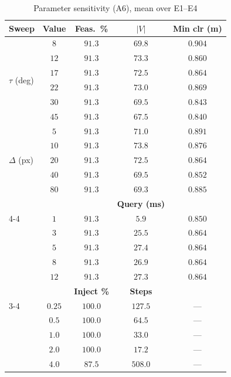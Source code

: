 \documentclass[conference]{IEEEtran}
\begin{document}
\begin{table}[htbp]
\caption{Parameter sensitivity (A6), mean over E1--E4}
\label{tab:sweep}
\begin{center}
\begin{tabular}{@{}lcccc@{}}
\toprule
\textbf{Sweep} & \textbf{Value} & \textbf{Feas.\ \%} & \textbf{$|V|$} & \textbf{Min clr (m)} \\ \midrule
\multirow{6}{*}{$\tau$ (deg)}
 & $8$  & $91.3$ & $69.8$ & $0.904$ \\
 & $12$ & $91.3$ & $73.3$ & $0.860$ \\
 & $17$ & $91.3$ & $72.5$ & $0.864$ \\
 & $22$ & $91.3$ & $73.0$ & $0.869$ \\
 & $30$ & $91.3$ & $69.5$ & $0.843$ \\
 & $45$ & $91.3$ & $67.5$ & $0.840$ \\ \midrule
\multirow{5}{*}{$\Delta$ (px)}
 & $5$  & $91.3$ & $71.0$ & $0.891$ \\
 & $10$ & $91.3$ & $73.8$ & $0.876$ \\
 & $20$ & $91.3$ & $72.5$ & $0.864$ \\
 & $40$ & $91.3$ & $69.5$ & $0.852$ \\
 & $80$ & $91.3$ & $69.3$ & $0.885$ \\ \midrule
 & & & \textbf{Query (ms)} & \\ \cmidrule(l){4-4}
\multirow{5}{*}{$K$}
 & $1$  & $91.3$ & $5.9$  & $0.850$ \\
 & $3$  & $91.3$ & $25.5$ & $0.864$ \\
 & $5$  & $91.3$ & $27.4$ & $0.864$ \\
 & $8$  & $91.3$ & $26.9$ & $0.864$ \\
 & $12$ & $91.3$ & $27.3$ & $0.864$ \\ \midrule
 & & \textbf{Inject \%} & \textbf{Steps} & \\ \cmidrule(l){3-4}
\multirow{5}{*}{$\alpha$ (px)}
 & $0.25$ & $100.0$ & $127.5$ & --- \\
 & $0.5$  & $100.0$ & $64.5$  & --- \\
 & $1.0$  & $100.0$ & $33.0$  & --- \\
 & $2.0$  & $100.0$ & $17.2$  & --- \\
 & $4.0$  & $87.5$  & $508.0$ & --- \\ \bottomrule
\end{tabular}
\end{center}
\end{table}
\end{document}
